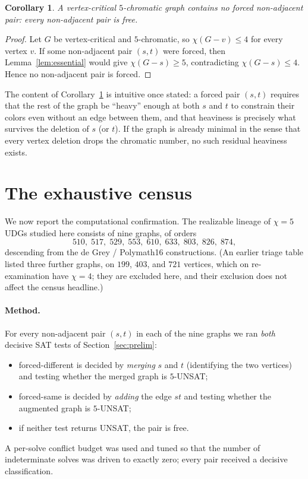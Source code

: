 \documentclass[11pt]{article}
\newtheorem{corollary}{Corollary}
\theoremstyle{definition}
\newcommand{\chrom}{\chi}
\begin{document}
\begin{corollary}
\label{cor:critical-free}
A vertex-critical $5$-chromatic graph contains \emph{no} forced non-adjacent
pair: every non-adjacent pair is free.
\end{corollary}

\begin{proof}
Let $G$ be vertex-critical and $5$-chromatic, so $\chrom(G - v) \le 4$ for every
vertex $v$. If some non-adjacent pair $(s,t)$ were forced, then
Lemma~\ref{lem:essential} would give $\chrom(G - s) \ge 5$, contradicting
$\chrom(G - s) \le 4$. Hence no non-adjacent pair is forced.
\end{proof}

The content of Corollary~\ref{cor:critical-free} is intuitive once stated: a
forced pair $(s,t)$ requires that the rest of the graph be ``heavy'' enough at
both $s$ and $t$ to constrain their colors even without an edge between them, and
that heaviness is precisely what survives the deletion of $s$ (or $t$). If the
graph is already minimal in the sense that every vertex deletion drops the
chromatic number, no such residual heaviness exists.

\section{The exhaustive census}
\label{sec:census}

We now report the computational confirmation. The realizable lineage of
$\chrom = 5$ UDGs studied here consists of nine graphs, of orders
\[
  510,\; 517,\; 529,\; 553,\; 610,\; 633,\; 803,\; 826,\; 874,
\]
descending from the de Grey / Polymath16 constructions. (An earlier triage table
listed three further graphs, on $199$, $403$, and $721$ vertices, which on
re-examination have $\chrom = 4$; they are excluded here, and their exclusion
does not affect the census headline.)

\paragraph{Method.} For every non-adjacent pair $(s,t)$ in each of the nine
graphs we ran \emph{both} decisive SAT tests of Section~\ref{sec:prelim}:
\begin{itemize}
  \item forced-different is decided by \emph{merging} $s$ and $t$ (identifying the
        two vertices) and testing whether the merged graph is $5$-UNSAT;
  \item forced-same is decided by \emph{adding} the edge $st$ and testing whether
        the augmented graph is $5$-UNSAT;
  \item if neither test returns UNSAT, the pair is free.
\end{itemize}
A per-solve conflict budget was used and tuned so that the number of
indeterminate solves was driven to exactly zero; every pair received a decisive
classification.
\end{document}

